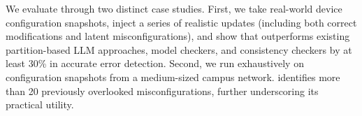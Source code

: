 We evaluate \sysname{} through two distinct case studies. First, we take
real-world device configuration snapshots, inject a series of realistic
updates (including both correct modifications and latent misconfigurations),
and show that \sysname{} outperforms existing partition-based LLM approaches,
model checkers, and consistency checkers by at least 30\% in accurate error
detection. Second, we run \sysname{} exhaustively on configuration snapshots
from a medium-sized campus network. \sysname{} identifies more than 20
previously overlooked misconfigurations, further underscoring its practical
utility.
